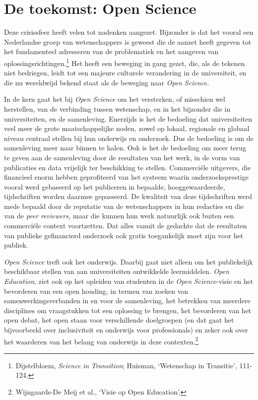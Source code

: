 \documentclass[smallauthor, chapterhaspagenum, nochapterinheader, pagenuminheader,  bigchapnum,medium2, tocpages, garamond, titleinheader]{jote-book}
\begin{document}
	\section{De toekomst: Open Science }



	Deze crisissfeer heeft velen tot nadenken aangezet. Bijzonder is dat het vooral een Nederlandse groep van wetenschappers is geweest die de aanzet heeft gegeven tot het fundamenteel adresseren van de problematiek en het aangeven van oplossingsrichtingen.\footnote{Dijstelbloem, \emph{Science}\emph{ in }\emph{Transition}; Huisman, ‘Wetenschap in Transitie', 111-124.} Het heeft een beweging in gang gezet, die, als de tekenen niet bedriegen, leidt tot een majeure culturele verandering in de universiteit, en die nu wereldwijd bekend staat als de beweging naar \emph{Open }\emph{Science}\emph{.}



	In de kern gaat het bij \emph{Open }\emph{Science} om het versterken, of misschien wel herstellen, van de verbinding tussen wetenschap, en in het bijzonder die in universiteiten, en de samenleving. Enerzijds is het de bedoeling dat universiteiten veel meer de grote maatschappelijke noden, zowel op lokaal, regionale en globaal niveau centraal stellen bij hun onderwijs en onderzoek. Dus de bedoeling is om de samenleving meer naar binnen te halen. Ook is het de bedoeling om meer terug te geven aan de samenleving door de resultaten van het werk, in de vorm van publicaties en data vrijelijk ter beschikking te stellen. Commerciële uitgevers, die financieel enorm hebben geprofiteerd van het systeem waarin onderzoeksprestige vooral werd gebaseerd op het publiceren in bepaalde, hooggewaardeerde, tijdschriften worden daarmee gepasseerd. De kwaliteit van deze tijdschriften werd mede bepaald door de reputatie van de wetenschappers in hun redacties en die van de \emph{peer}\emph{ }\emph{reviewers}\emph{, }maar die\emph{ }kunnen hun werk natuurlijk ook buiten een commerciële context voortzetten. Dat alles vanuit de gedachte dat de resultaten van publieke gefinancierd onderzoek ook gratis toegankelijk moet zijn voor het publiek.



	\emph{Open }\emph{Science} treft ook het onderwijs. Daarbij gaat niet alleen om het publiekelijk beschikbaar stellen van aan universiteiten ontwikkelde leermiddelen. \emph{Open }\emph{Education}, ziet ook op het opleiden van studenten in de \emph{Open }\emph{Science}-visie en het bevorderen van een open houding, in termen van zoeken van samenwerkingsverbanden in en voor de samenleving, het betrekken van meerdere disciplines om vraagstukken tot een oplossing te brengen, het bevorderen van het open debat, het open staan voor verschillende doelgroepen (en dat gaat het bijvoorbeeld over inclusiviteit en onderwijs voor professionals) en zeker ook over het waarderen van het belang van onderwijs in deze contexten.\footnote{Wijngaards-De Meij et al., ‘Visie op Open Education'.}
\end{document}
